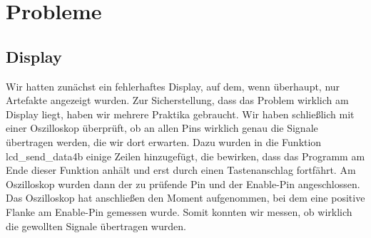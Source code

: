 \section{Probleme}

\subsection{Display}

Wir hatten zunächst ein fehlerhaftes Display, auf dem, wenn überhaupt, nur Artefakte angezeigt wurden. Zur Sicherstellung, dass das Problem wirklich am Display liegt, haben wir mehrere Praktika gebraucht. Wir haben schließlich mit einer Oszilloskop überprüft, ob an allen Pins wirklich genau die Signale übertragen werden, die wir dort erwarten. Dazu wurden in die Funktion lcd\_send\_data4b einige Zeilen hinzugefügt, die bewirken, dass das Programm am Ende dieser Funktion anhält und erst durch einen Tastenanschlag fortfährt. Am Oszilloskop wurden dann der zu prüfende Pin und der Enable-Pin angeschlossen. Das Oszilloskop hat anschließen den Moment aufgenommen, bei dem eine positive Flanke am Enable-Pin gemessen wurde. Somit konnten wir messen, ob wirklich die gewollten Signale übertragen wurden.